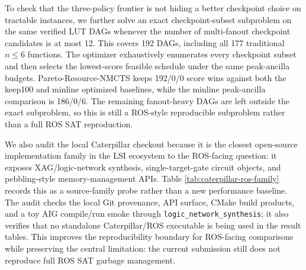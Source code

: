 \documentclass[11pt]{article}
\newcommand{\method}{Resource-NMCTS}
\begin{document}
To check that the three-policy frontier is not hiding a better checkpoint
choice on tractable instances, we further solve an exact checkpoint-subset
subproblem on the same verified LUT DAGs whenever the number of multi-fanout
checkpoint candidates is at most 12.  This covers 192 DAGs, including all 177
traditional $n\leq6$ functions.  The optimizer exhaustively enumerates every
checkpoint subset and then selects the lowest-score feasible schedule under
the same peak-ancilla budgets.  Pareto-\method{} keeps 192/0/0 score wins
against both the keep100 and minline optimized baselines, while the minline
peak-ancilla comparison is 186/0/6.  The remaining fanout-heavy DAGs are left
outside the exact subproblem, so this is still a ROS-style reproducible
subproblem rather than a full ROS SAT reproduction.

\begin{table}[H]
\centering
\small
\caption{Exact checkpoint-subset optimizer for tractable ROS-style LUT DAGs.
The optimizer exhaustively enumerates checkpoint subsets for DAGs with at most
12 multi-fanout candidates.  It covers all traditional $n\leq6$ functions but
does not reproduce the full ROS SAT garbage-management flow.}
\label{tab:ros-checkpoint-optimizer}

\end{table}

We also audit the local Caterpillar checkout because it is the closest
open-source implementation family in the LSI ecosystem to the ROS-facing
question: it exposes XAG/logic-network synthesis, single-target-gate circuit
objects, and pebbling-style memory-management APIs.  Table
\ref{tab:caterpillar-ros-family} records this as a source-family probe rather
than a new performance baseline.  The audit checks the local Git provenance, API
surface, CMake build products, and a toy AIG compile/run smoke through
\texttt{logic\_network\_synthesis}; it also verifies that no standalone
Caterpillar/ROS executable is being used in the result tables.  This improves
the reproducibility boundary for ROS-facing comparisons while preserving the
central limitation: the current submission still does not reproduce full ROS
SAT garbage management.

\begin{table}[H]
\centering
\scriptsize
\setlength{\tabcolsep}{3pt}
\caption{Caterpillar ROS-family source probe.  This is a local source/API/build
and toy compile smoke audit for a related open-source synthesis library; it is
not a full ROS SAT garbage-management reproduction, and this source-only audit
is not itself a standalone performance baseline.}
\label{tab:caterpillar-ros-family}

\end{table}
\end{document}
